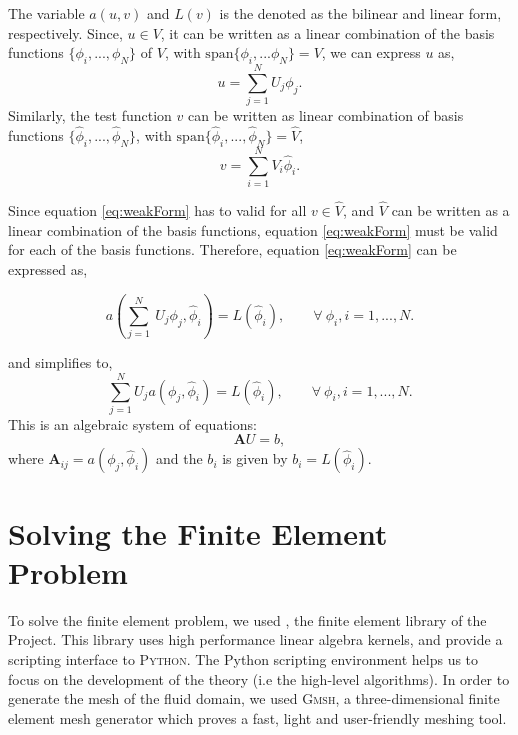 The variable $a(u,v)$ and $L(v)$ is the denoted as the bilinear and linear form, respectively. Since, $u\in V$, it can be written as a linear combination of the basis functions $\{\phi_i,...,\phi_N\}$ of $V$, with $\mathrm{span}\{\phi_i,...\phi_N\}=V$, we can express $u$ as,
	\begin{equation}
	u = \sum_{j=1}^{N} U_j \phi_j.
	\label{eq:trialDiscrete}
	\end{equation}
Similarly, the test function $v$ can be written as linear combination of basis functions $\{\hat{\phi}_i,...,\hat{\phi}_N\}$, with $\mathrm{span}\{\hat{\phi}_i,...,\hat{\phi}_N\}=\hat{V}$, 
	\begin{equation}
	v=\sum_{i=1}^{N} V_i \hat{\phi}_i.
	\label{eq:testDiscrete}
	\end{equation}
		
Since equation \ref{eq:weakForm} has to valid for all $v \in \hat{V}$, and $\hat{V}$ can be written as a linear combination of the basis functions, equation \ref{eq:weakForm} must be valid for each of the basis functions. Therefore, equation \ref{eq:weakForm} can be expressed as, 

	\begin{equation}
	a(\sum_{j=1}^N \ U_j \phi_j,\hat{\phi}_i) = L(\hat{\phi}_i), \qquad \forall\ \phi_i, i = 1,...,N.
	\end{equation}

and simplifies to,	
	\begin{equation}
	\sum_{j=1}^N U_j a(\phi_j,\hat{\phi}_i) = L(\hat{\phi}_i), \qquad \forall\ \phi_i, i = 1,...,N.
	\end{equation}
This is an algebraic system of equations:
	\begin{equation}
	\mathbf{A}U = b,
	\label{eq:linearSysOfEq}
	\end{equation}	
where $\mathbf{A}_{ij} = a(\phi_j,\hat{\phi}_i)$ and the  $b_i$ is given by $b_i=L(\hat{\phi}_i)$.
 	
\section{Solving the Finite Element Problem}
\label{sec:e-stfep}

To solve the finite element problem, we used \dolfin, the finite element library of the \fenics Project. This library uses high performance linear algebra kernels, and provide a scripting interface to \textsc{Python}. The Python scripting environment helps us to focus on the development of the theory (i.e the high-level algorithms). In order to generate the mesh of the fluid domain, we used \textsc{Gmsh}, a three-dimensional finite element mesh generator which proves a fast, light and user-friendly meshing tool.

